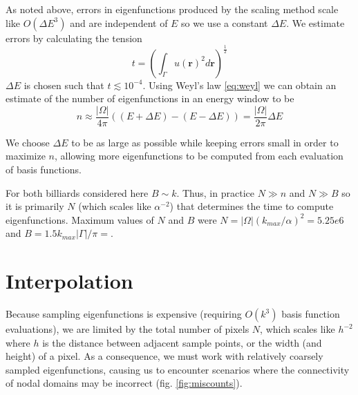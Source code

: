 \documentclass{report}
\newcommand{\rr}[0]{\mathbf{r}}
\begin{document}
As noted above, errors in eigenfunctions produced by the scaling method scale like $O({\Delta E}^{3})$ and are independent of $E$ so we use a constant $\Delta E$. We estimate errors by calculating the tension
\[
t = \left( \int_{\Gamma} u(\rr)^{2} d\rr \right)^{\frac{1}{2}}
\]
$\Delta E$ is chosen such that $t \lesssim 10^{-4}$. Using Weyl's law \ref{eq:weyl} we can obtain an estimate of the number of eigenfunctions in an energy window to be
\[
n \approx \frac{\vert \Omega \vert}{4 \pi} ((E + \Delta E) - (E - \Delta E)) = \frac{\vert \Omega \vert}{2 \pi} \Delta E
\]

We choose $\Delta E$ to be as large as possible while keeping errors small in order to maximize $n$, allowing more eigenfunctions to be computed from each evaluation of basis functions.

For both billiards considered here $B \sim k$. Thus, in practice $N \gg n$ and $N \gg B$ so it is primarily $N$ (which scales like $\alpha^{-2}$) that determines the time to compute eigenfunctions. Maximum values of $N$ and $B$ were $N = \vert \Omega \vert (k_{max} / \alpha)^2 = 5.25e6$ and $B = 1.5 k_{max} \vert \Gamma \vert / \pi = $. %

\section{Interpolation}
\label{sec:interpolation}
Because sampling eigenfunctions is expensive (requiring $O(k^{3})$ basis function evaluations), we are limited by the total number of pixels $N$, which scales like $h^{-2}$ where $h$ is the distance between adjacent sample points, or the width (and height) of a pixel. As a consequence, we must work with relatively coarsely sampled eigenfunctions, causing us to encounter scenarios where the connectivity of nodal domains may be incorrect (fig. \ref{fig:miscounts}).
\end{document}

